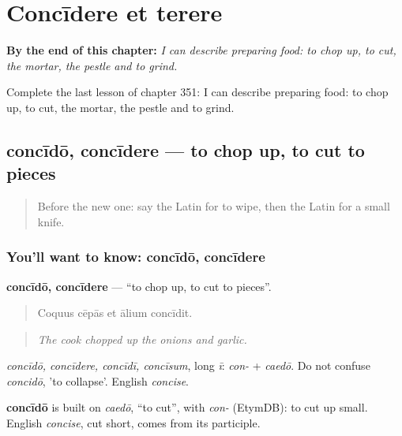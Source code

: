 
\chapter{Concīdere et terere}
\label{ch:la-concidere-et-terere}

\begin{chapteropening}
\textbf{By the end of this chapter:} \emph{I can describe preparing food: to chop up, to cut, the mortar, the pestle and to grind.}

Complete the last lesson of chapter 351: I can describe preparing food: to chop up, to cut, the mortar, the pestle and to grind.
\end{chapteropening}

\section[concīdō, concīdere]{concīdō, concīdere — to chop up, to cut to pieces}

\label{lesson:LA-C351-concido}



\begin{quote}
Before the new one: say the Latin for to wipe, then the Latin for a small knife.
\end{quote}

\subsection*{You'll want to know: concīdō, concīdere}
\textbf{concīdō, concīdere} — \textquotedblleft{}to chop up, to cut to pieces\textquotedblright{}.

\begin{quote}
Coquus cēpās et ālium concīdit.
\end{quote}

\begin{quote}
\emph{The cook chopped up the onions and garlic.}
\end{quote}

\emph{concīdō, concīdere, concīdī, concīsum}, long \emph{ī}: \emph{con-} + \emph{caedō}. Do not confuse \emph{concidō}, 'to collapse'. English \emph{concise}.

\begin{cousinweb}
\textbf{concīdō} is built on \emph{caedō}, \textquotedblleft{}to cut\textquotedblright{}, with \emph{con-} (EtymDB): to cut up small. English \emph{concise}, cut short, comes from its participle.
\end{cousinweb}

